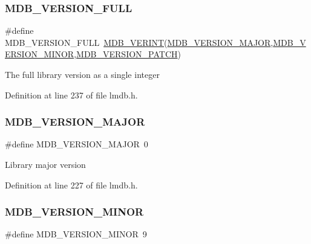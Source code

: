 \subsubsection{\texorpdfstring{M\+D\+B\+\_\+\+V\+E\+R\+S\+I\+O\+N\+\_\+\+F\+U\+LL}{MDB\_VERSION\_FULL}}
{\footnotesize\ttfamily \#define M\+D\+B\+\_\+\+V\+E\+R\+S\+I\+O\+N\+\_\+\+F\+U\+LL~\mbox{\hyperlink{group___version_gaa50172fa8a795f877c9304d29aefb14b}{M\+D\+B\+\_\+\+V\+E\+R\+I\+NT}}(\mbox{\hyperlink{group___version_ga4d29d48a85ec25636fac7831b8b9b807}{M\+D\+B\+\_\+\+V\+E\+R\+S\+I\+O\+N\+\_\+\+M\+A\+J\+OR}},\mbox{\hyperlink{group___version_ga44da0474969d76ad5521f8b7de4dd32f}{M\+D\+B\+\_\+\+V\+E\+R\+S\+I\+O\+N\+\_\+\+M\+I\+N\+OR}},\mbox{\hyperlink{group___version_gaeddac7231e1cdcbe2b7541cbfa33e82a}{M\+D\+B\+\_\+\+V\+E\+R\+S\+I\+O\+N\+\_\+\+P\+A\+T\+CH}})}

The full library version as a single integer 

Definition at line 237 of file lmdb.\+h.

\mbox{\label{group___version_ga4d29d48a85ec25636fac7831b8b9b807}} 
\subsubsection{\texorpdfstring{M\+D\+B\+\_\+\+V\+E\+R\+S\+I\+O\+N\+\_\+\+M\+A\+J\+OR}{MDB\_VERSION\_MAJOR}}
{\footnotesize\ttfamily \#define M\+D\+B\+\_\+\+V\+E\+R\+S\+I\+O\+N\+\_\+\+M\+A\+J\+OR~0}

Library major version 

Definition at line 227 of file lmdb.\+h.

\mbox{\label{group___version_ga44da0474969d76ad5521f8b7de4dd32f}} 
\subsubsection{\texorpdfstring{M\+D\+B\+\_\+\+V\+E\+R\+S\+I\+O\+N\+\_\+\+M\+I\+N\+OR}{MDB\_VERSION\_MINOR}}
{\footnotesize\ttfamily \#define M\+D\+B\+\_\+\+V\+E\+R\+S\+I\+O\+N\+\_\+\+M\+I\+N\+OR~9}


